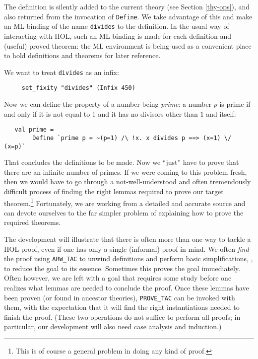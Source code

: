 The definition is silently added to the current theory (see Section
\ref{thy-ops}), and also returned from the invocation of \verb+Define+. We 
take advantage of this and make an ML binding of the name \verb+divides+
to the definition. In the usual way of interacting with HOL, such an ML
binding is made for each definition and (useful) proved theorem: the ML
environment is being used as a convenient place to hold definitions and
theorems for later reference. 

We want to treat \verb+divides+ as an infix: 
{\small\begin{verbatim}
     set_fixity "divides" (Infix 450)
\end{verbatim}}
Now we can define the property of a number being {\it prime}: a number $p$ is
prime if and only if it is not equal to 1 and it has no divisors other
than $1$ and itself:

{\small\begin{verbatim}
   val prime = 
        Define `prime p = ~(p=1) /\ !x. x divides p ==> (x=1) \/ (x=p)`
\end{verbatim}}

That concludes the definitions to be made. Now we ``just'' have to prove
that there are an infinite number of primes. If we were coming to this
problem fresh, then we would have to go through a not-well-understood
and often tremendously difficult process of finding the right lemmas
required to prove our target theorem.\footnote{This is of course a
general problem in doing any kind of proof.} Fortunately, we are working
from a detailed and accurate source and can devote ourselves to the far
simpler problem of explaining how to prove the required theorems.

The development will illustrate that there is often more than one way to
tackle a HOL proof, even if one has only a single (informal) proof in
mind. We often {\it find\/} the proof using \verb+ARW_TAC+ to unwind
definitions and perform basic simplifications, \ie, to reduce the goal
to its essence. Sometimes this proves the goal immediately. Often
however, we are left with a goal that requires some study before one
realizes what lemmas are needed to conclude the proof. Once these lemmas
have been proven (or found in ancestor theories), \verb+PROVE_TAC+ can
be invoked with them, with the expectation that it will find the right
instantiations needed to finish the proof. (These two operations do not
suffice to perform all proofs; in particular, our development will also need
case analysis and induction.)

